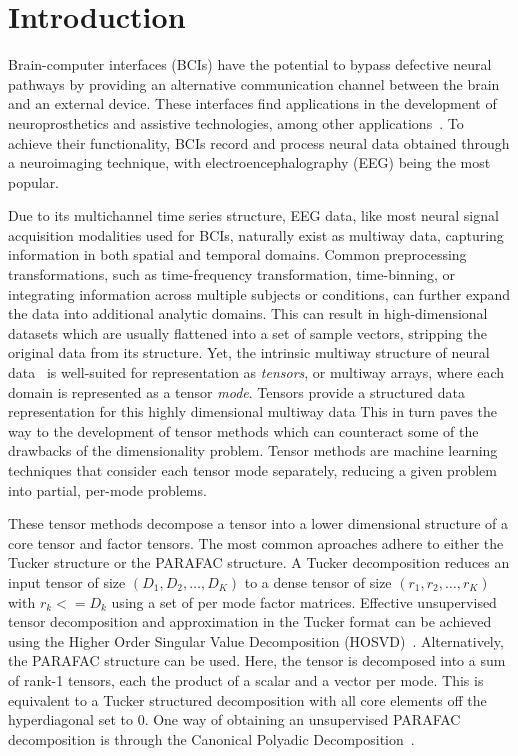 

\section{Introduction}

Brain-computer interfaces (BCIs) have the potential to bypass
defective neural pathways by providing an alternative communication channel
between the brain and an external device.
These interfaces find applications in the development of neuroprosthetics and assistive
technologies, among other applications~\cite{Wolpaw2020}.
To achieve their functionality, BCIs record and process neural data obtained through
a neuroimaging technique, with electroencephalography (EEG) being the most popular.


Due to its multichannel time series structure, EEG data, like most neural
signal acquisition modalities used for BCIs, naturally exist as multiway data,
capturing information in both spatial and temporal domains.
Common preprocessing transformations, such as time-frequency transformation,
time-binning, or integrating information across multiple subjects or conditions,
can further expand the data into additional analytic domains.
This can result in high-dimensional datasets which are usually flattened into a
set of sample vectors, stripping the original data from its structure.
Yet, the intrinsic multiway structure of neural data~\cite{Erol2022} is
well-suited for representation as \emph{tensors}, or multiway arrays, where
each domain is represented as a tensor \emph{mode}.
Tensors provide a structured data representation for this highly dimensional
multiway data
This in turn paves the way to the development of tensor methods which can
counteract some of the drawbacks of the dimensionality problem.
Tensor methods are machine learning techniques that  consider each tensor mode
separately, reducing a given problem into partial, per-mode problems.

These tensor methods decompose a tensor into a lower dimensional structure of a
core tensor and factor tensors.
The most common aproaches adhere to either the Tucker structure or the PARAFAC
structure.
A Tucker decomposition reduces an input tensor of size $(D_1,D_2,\ldots,D_K)$ to
a dense  tensor of size $(r_1,r_2,\ldots,r_K)$ with $r_k<=D_k$ using a
set of per mode factor matrices.
Effective unsupervised tensor decomposition and approximation in the Tucker format can be achieved
using the Higher Order Singular Value
Decomposition (HOSVD)~\cite{DeLathauwer2000,SoleCasals2018}.
Alternatively, the PARAFAC structure can be used.
Here, the tensor is decomposed into a sum of rank-1 tensors, each the product
of a scalar and a vector per mode.
This is equivalent to a Tucker structured decomposition with all core elements
off the hyperdiagonal set to 0.
One way of obtaining an unsupervised PARAFAC decomposition is through the Canonical Polyadic
Decomposition~\cite{Hitchcock1927,Nazarpour2006}.

